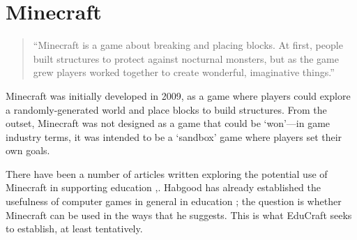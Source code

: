 \section{Minecraft}
\begin{quote}
``Minecraft is a game about breaking and placing blocks. At first, people
built structures to protect against nocturnal monsters, but as the game grew
players worked together to create wonderful, imaginative things.''
\cite{website:minecraft}
\end{quote}

Minecraft was initially developed in 2009, as a game where players could
explore a randomly-generated world and place blocks to build structures. From
the outset, Minecraft was not designed as a game that could be `won'---in
game industry terms, it was intended to be a `sandbox' game where players set
their own goals.

There have been a number of articles written exploring the potential use of
Minecraft in supporting education \cite{brand13},\cite{short12}. Habgood has
already established the usefulness of computer games in general in education
\cite{habgood07}; the question is whether Minecraft can be used in the ways
that he suggests. This is what EduCraft seeks to establish, at least tentatively.
